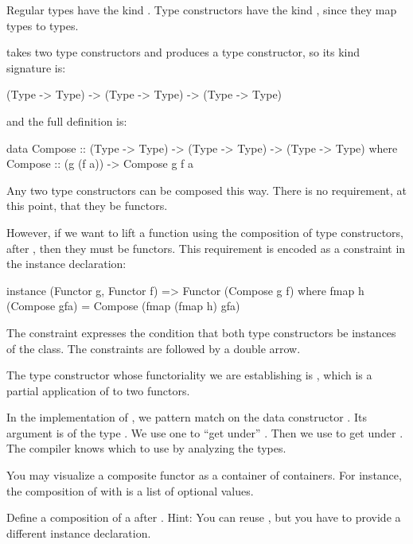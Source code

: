 \documentclass[DaoFP]{subfiles}
\begin{document}
Regular types have the kind . Type constructors have the kind , since they map types to types. 

 takes two type constructors and produces a type constructor, so its kind signature is:
\begin{haskell}
(Type -> Type) -> (Type -> Type) -> (Type -> Type) 
\end{haskell}
and the full definition is:
\begin{haskell}
data Compose :: (Type -> Type) -> (Type -> Type) -> (Type -> Type) 
  where
    Compose :: (g (f a)) -> Compose g f a
\end{haskell}

Any two type constructors can be composed this way. There is no requirement, at this point, that they be functors. 

However, if we want to lift a function using the composition of type constructors,  after , then they must be functors. This requirement is encoded as a constraint in the instance declaration:
\begin{haskell}
instance (Functor g, Functor f) => Functor (Compose g f) where
  fmap h (Compose gfa) = Compose (fmap (fmap h) gfa)
\end{haskell}
The constraint  expresses the condition that both type constructors be instances of the  class. The constraints are followed by a double arrow. 

The type constructor whose functoriality we are establishing is , which is a partial application of  to two functors. 

In the implementation of , we pattern match on the data constructor . Its argument  is of the type . We use one  to ``get under'' . Then we use  to get under . The compiler knows which  to use by analyzing the types. 

You may visualize a composite functor as a container of containers. For instance, the composition of \hask{[]} with  is a list of optional values. 

\begin{exercise}
Define a composition of a  after . Hint: You can reuse , but you have to provide a different instance declaration.
\end{exercise}
\end{document}
